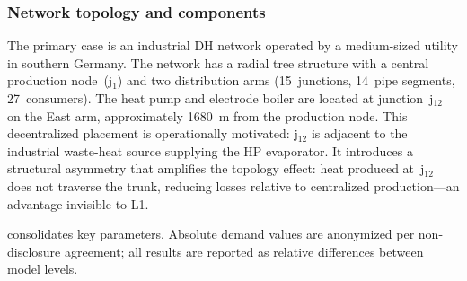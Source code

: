 \documentclass[review,3p]{elsarticle}
\begin{document}
\subsubsection{Network topology and components}

The primary case is an industrial DH network operated by a
medium-sized utility in southern Germany. The network has a radial
tree structure with a central production node~(j$_1$) and two
distribution arms (15~junctions, 14~pipe segments, 27~consumers). The
heat pump and electrode boiler are located at junction~j$_{12}$ on the
East arm, approximately \SI{1680}{\metre} from the production node.
This decentralized placement is operationally motivated: j$_{12}$ is
adjacent to the industrial waste-heat source supplying the HP
evaporator. It introduces a structural asymmetry that amplifies the
topology effect: heat produced at~j$_{12}$ does not traverse the
trunk, reducing losses relative to centralized production---an
advantage invisible to L1.

 consolidates key parameters. Absolute demand
values are anonymized per non-disclosure agreement; all results are
reported as relative differences between model levels.
\end{document}
